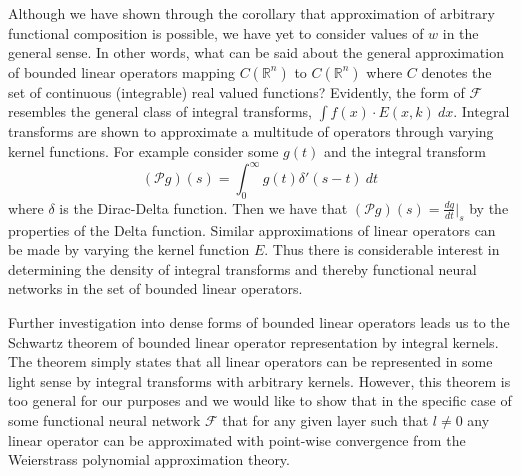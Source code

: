 \documentclass{article}
\begin{document}
Although we have shown through the corollary that approximation of arbitrary functional composition is possible, we have yet to consider values of $w$ in the general sense. In other words, what can be said about the general approximation of bounded linear operators mapping  $C(\mathbb{R}^n)$ to $C(\mathbb{R}^n)$ where $C$ denotes the set of continuous (integrable) real valued functions? Evidently, the form of $\mathcal{F}$ resembles the general class of integral transforms, $\int f(x)\cdot E(x,k)\ dx$. Integral transforms are shown to approximate a multitude of operators through varying kernel functions. For example consider some $g(t)$ and the integral transform
\begin{equation}(\mathcal{P}g)(s) = \int_0^\infty g(t)\delta'(s-t)\ dt\end{equation}
where $\delta$ is the Dirac-Delta function. Then we have that $(\mathcal{P}g)(s) = \frac{dg}{dt}\Big|_s$ by the properties of the Delta function. Similar approximations of linear operators can be made by varying the kernel function $E$. Thus there is considerable interest in determining the density of integral transforms and thereby functional neural networks in the set of bounded linear operators.


Further investigation into dense forms of bounded linear operators leads us to the Schwartz theorem of bounded linear operator representation by integral kernels. The theorem simply states that all linear operators can be represented in some light sense by integral transforms with arbitrary kernels. However, this theorem is too general for our purposes and we would like to show that in the specific case of some functional neural network $\mathcal{F}$ that for any given layer such that $l\neq 0$ any linear operator can be approximated with point-wise convergence from the Weierstrass polynomial approximation theory.
\end{document}

